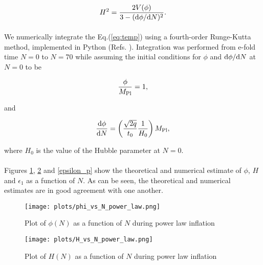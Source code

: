 \documentclass[12pt,a4paper,oneside]{book}
\begin{document}
\begin{equation}
H^2 = \frac{2V(\phi)}{3-({\rm d}\phi/{\rm d}N)^2}.
\end{equation}

\paragraph*{} We numerically integrate the Eq.(\ref{eq:temp}) using a 
fourth-order Runge-Kutta method, implemented in Python (Refs. \cite{python, numpy, matplotlib}). Integration was performed from 
e-fold time $N = 0$ to $N = 70$ while assuming the initial conditions for $\phi$ and 
${\rm d}\phi/{\rm d}N$ at $N = 0$ to be 

\begin{equation}
\frac{\phi}{M_{\rm Pl}} = 1,
\end{equation}

\noindent and

\begin{equation}
\frac{{\rm d}\phi}{{\rm d}N} = \left(\frac{\sqrt{2q}}{t_0}\frac{1}{H_0}\right)M_{\rm Pl},
\end{equation}

\noindent where $H_0$ is the value of the Hubble parameter at $N=0$.

\paragraph*{} Figures \ref{field_p}, \ref{Hubble_p} and \ref{epsilon_p} show the theoretical and 
numerical estimate of $\phi$, $H$ and $\epsilon_1$ as a function of $N$. As can be seen, the 
theoretical and numerical estimates are in good agreement with one another.

\begin{figure}
\begin{center}
\texttt{[image: plots/phi\_vs\_N\_power\_law.png]}
\caption[Plot of $\phi(N)$ as a function of $N$ during power law inflation]{Plot of $\phi(N)$ as a function of $N$ during power law inflation}
\label{field_p}
\end{center}
\end{figure}

\begin{figure}
\begin{center}
\texttt{[image: plots/H\_vs\_N\_power\_law.png]}
\caption[Plot of $H(N)$ as a function of $N$ during power law inflation]{Plot of $H(N)$ as a function of $N$ during power law inflation}
\label{Hubble_p}
\end{center}
\end{figure}
\end{document}
